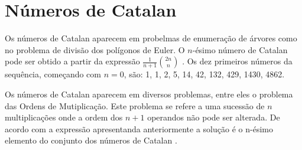 \chapter{Números de Catalan}
Os números de Catalan aparecem em probelmas de enumeração de árvores como no problema de divisão dos polígonos de Euler. O $n$-ésimo número de Catalan pode ser obtido a partir da expressão $\frac{1}{n+1} \binom{2n}{n} $ \cite{wolfram}. Os dez primeiros números da sequência, começando com $n = 0$, são: 1, 1, 2, 5, 14, 42, 132, 429, 1430, 4862.

Os números de Catalan aparecem em diversos problemas, entre eles o problema das Ordens de Mutiplicação.
Este problema se refere a uma sucessão de $n$ multiplicações onde a ordem dos $n+1$ operandos não pode ser alterada. De acordo com a expressão apresentanda anteriormente a solução é o n-ésimo elemento do conjunto dos números de Catalan \cite{catNum}.
